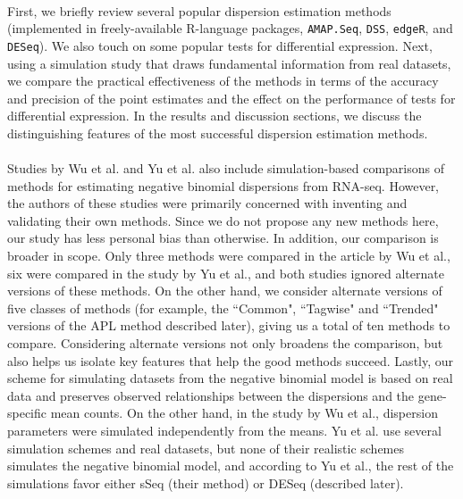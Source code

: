 \documentclass[10pt]{article}
\begin{document}
\paragraph{} \indent First, we briefly review several popular dispersion estimation methods (implemented in freely-available R-language packages, {\tt AMAP.Seq}, {\tt DSS}, {\tt edgeR}, and {\tt DESeq}). We also touch on some popular tests for differential expression. Next, using a simulation study that draws fundamental information from real datasets, we compare the practical effectiveness of the methods in terms of the accuracy and precision of the point estimates and the effect on the performance of tests for differential expression. In the results and discussion sections, we discuss the distinguishing features of the most successful dispersion estimation methods.

 \paragraph{} \indent Studies by Wu et al. \cite{dss} and Yu et al. \cite{yu} also include simulation-based comparisons of methods for estimating negative binomial dispersions from RNA-seq. However, the authors of these studies were primarily concerned with inventing and validating their own methods. Since we do not propose any new methods here, our study has less personal bias than otherwise. In addition, our comparison is broader in scope. Only three methods were compared in the article by Wu et al., six were compared in the study by Yu et al., and both studies ignored alternate versions of these methods. On the other hand, we consider alternate versions of five classes of methods (for example, the ``Common", ``Tagwise" and ``Trended" versions of the APL method described later), giving us a total of ten methods to compare. Considering alternate versions not only broadens the comparison, but also helps us isolate key features that help the good methods succeed. Lastly, our scheme for simulating datasets from the negative binomial model is based on real data and preserves observed relationships between the dispersions and the gene-specific mean counts. On the other hand, in the study by Wu et al., dispersion parameters were simulated independently from the means. Yu et al. use several simulation schemes and real datasets, but none of their realistic schemes simulates the negative binomial model, and according to Yu et al., the rest of the simulations favor either sSeq (their method) or DESeq (described later). 
\end{document}

